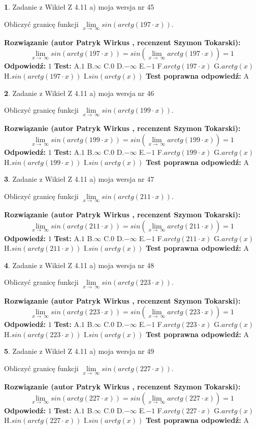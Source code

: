 \documentclass[12pt, a4paper]{article}
\theoremstyle{definition} %
\newtheorem{zad}{}
\newcommand{\zadStart}[1]{\begin{zad}#1\newline}
\newcommand{\zadStop}{\end{zad}}
\newcommand{\rozwStart}[2]{\noindent \textbf{Rozwiązanie (autor #1 , recenzent #2): }\newline}
\newcommand{\rozwStop}{\newline}
\newcommand{\odpStart}{\noindent \textbf{Odpowiedź:}\newline}
\newcommand{\odpStop}{\newline}
\newcommand{\testStart}{\noindent \textbf{Test:}\newline}
\newcommand{\testStop}{\newline}
\newcommand{\kluczStart}{\noindent \textbf{Test poprawna odpowiedź:}\newline}
\newcommand{\kluczStop}{\newline}
\begin{document}
\zadStart{Zadanie z Wikieł Z 4.11 a) moja wersja nr 45}

Obliczyć granicę funkcji  $\lim\limits_{x\to\ \infty}sin(arctg(197\cdot x))$.
\zadStop
\rozwStart{Patryk Wirkus}{Szymon Tokarski}
$$\lim\limits_{x\to\ \infty}sin(arctg(197\cdot x)) = sin(\lim\limits_{x\to\ \infty}arctg(197\cdot x)) = 1$$
\rozwStop
\odpStart
$1$
\odpStop
\testStart
A.$1$ B.$\infty$ C.$0$ D.$-\infty$ E.$-1$
F.$arctg(197\cdot x)$ G.$arctg(x)$
H.$sin(arctg(197\cdot x))$
I.$sin(arctg(x))$
\testStop
\kluczStart
A
\kluczStop



\zadStart{Zadanie z Wikieł Z 4.11 a) moja wersja nr 46}

Obliczyć granicę funkcji  $\lim\limits_{x\to\ \infty}sin(arctg(199\cdot x))$.
\zadStop
\rozwStart{Patryk Wirkus}{Szymon Tokarski}
$$\lim\limits_{x\to\ \infty}sin(arctg(199\cdot x)) = sin(\lim\limits_{x\to\ \infty}arctg(199\cdot x)) = 1$$
\rozwStop
\odpStart
$1$
\odpStop
\testStart
A.$1$ B.$\infty$ C.$0$ D.$-\infty$ E.$-1$
F.$arctg(199\cdot x)$ G.$arctg(x)$
H.$sin(arctg(199\cdot x))$
I.$sin(arctg(x))$
\testStop
\kluczStart
A
\kluczStop



\zadStart{Zadanie z Wikieł Z 4.11 a) moja wersja nr 47}

Obliczyć granicę funkcji  $\lim\limits_{x\to\ \infty}sin(arctg(211\cdot x))$.
\zadStop
\rozwStart{Patryk Wirkus}{Szymon Tokarski}
$$\lim\limits_{x\to\ \infty}sin(arctg(211\cdot x)) = sin(\lim\limits_{x\to\ \infty}arctg(211\cdot x)) = 1$$
\rozwStop
\odpStart
$1$
\odpStop
\testStart
A.$1$ B.$\infty$ C.$0$ D.$-\infty$ E.$-1$
F.$arctg(211\cdot x)$ G.$arctg(x)$
H.$sin(arctg(211\cdot x))$
I.$sin(arctg(x))$
\testStop
\kluczStart
A
\kluczStop



\zadStart{Zadanie z Wikieł Z 4.11 a) moja wersja nr 48}

Obliczyć granicę funkcji  $\lim\limits_{x\to\ \infty}sin(arctg(223\cdot x))$.
\zadStop
\rozwStart{Patryk Wirkus}{Szymon Tokarski}
$$\lim\limits_{x\to\ \infty}sin(arctg(223\cdot x)) = sin(\lim\limits_{x\to\ \infty}arctg(223\cdot x)) = 1$$
\rozwStop
\odpStart
$1$
\odpStop
\testStart
A.$1$ B.$\infty$ C.$0$ D.$-\infty$ E.$-1$
F.$arctg(223\cdot x)$ G.$arctg(x)$
H.$sin(arctg(223\cdot x))$
I.$sin(arctg(x))$
\testStop
\kluczStart
A
\kluczStop



\zadStart{Zadanie z Wikieł Z 4.11 a) moja wersja nr 49}

Obliczyć granicę funkcji  $\lim\limits_{x\to\ \infty}sin(arctg(227\cdot x))$.
\zadStop
\rozwStart{Patryk Wirkus}{Szymon Tokarski}
$$\lim\limits_{x\to\ \infty}sin(arctg(227\cdot x)) = sin(\lim\limits_{x\to\ \infty}arctg(227\cdot x)) = 1$$
\rozwStop
\odpStart
$1$
\odpStop
\testStart
A.$1$ B.$\infty$ C.$0$ D.$-\infty$ E.$-1$
F.$arctg(227\cdot x)$ G.$arctg(x)$
H.$sin(arctg(227\cdot x))$
I.$sin(arctg(x))$
\testStop
\kluczStart
A
\kluczStop
\end{document}
